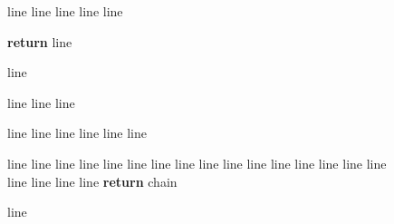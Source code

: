 \documentclass{article}
\begin{document}
\begin{figure*}[tb]
\begin{minipage}{0.56\textwidth}
\begin{algorithm}[H]
\begin{algorithmic}[1]
      \ENDWHILE
      \STATE
      \STATE line
      \STATE line 
      \STATE line
      \STATE line
    \ENDWHILE
    \STATE
      \STATE line
    \ENDFOR

    \STATE \textbf{return} line

  \end{algorithmic}
  \end{algorithm}
  \vspace{-18px}
  \end{minipage}\hspace{8px}
  \begin{minipage}{0.42\textwidth}

  \vspace{-10px}
  \begin{algorithm}[H]
    \caption{{\color{blue}line}}
    \label{alg:rpc}
  \begin{algorithmic}[1]
    \REQUIRE line
    \STATE line
      \STATE line
    \ENDFOR

      \STATE line
        \STATE line
        \STATE line
        \STATE \hspace{16px} line
        \STATE line
      \ENDFOR
      \STATE line
    \ENDWHILE

  \end{algorithmic}
  \end{algorithm}
  \vspace{-18px}
  \begin{algorithm}[H]
    \caption{{\color{blue}line}}
    \label{alg:replace}
  \begin{algorithmic}[1]
    \REQUIRE line
    \STATE line
    \STATE line
    \STATE line
    \STATE \hspace{8px} line
    \STATE line
    \STATE line
      \STATE \hspace{-4px} line
      \STATE \hspace{-4px} line
      \STATE \hspace{4px} line
      \STATE \hspace{4px} line
      \STATE \hspace{4px} line
      \STATE \hspace{4px} line
      \STATE \hspace{4px} line
      \STATE \hspace{4px} line
      \STATE \hspace{-4px} line
      \STATE \hspace{4px} line
      \STATE \hspace{4px} line
      \STATE \hspace{12px} line
      \STATE \hspace{4px} line
    \ENDWHILE
    \STATE \textbf{return} chain
  \end{algorithmic}
  \end{algorithm}
  \vspace{-18px}\end{minipage}
  \vspace{-5pt}
\end{figure*}
\end{document}
